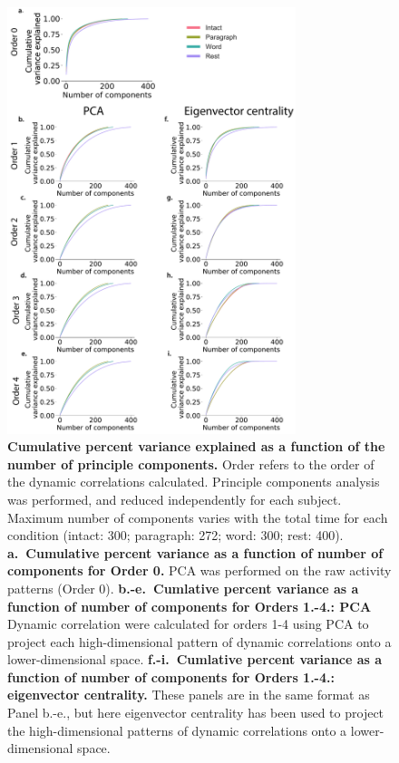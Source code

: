 \documentclass[english]{article}
\begin{document}
\begin{figure}[p!]
\centering
\includegraphics[width=0.75\textwidth]{figs/pca}
\caption{\textbf{Cumulative percent variance explained as a function
    of the number of principle components.}  Order refers to the order of the dynamic
    correlations calculated. Principle components analysis was
    performed, and reduced independently for each subject.  Maximum number of components varies with
    the total time for each condition (intact: 300; paragraph: 272;
    word: 300; rest: 400). \textbf{a.~Cumulative percent
    variance as a function of number of components for Order 0.} PCA
  was performed on the raw activity patterns (Order 0). \textbf{b.-e.~Cumlative percent
    variance as a function of number of components for Orders 1.-4.:
    PCA} Dynamic correlation were calculated for orders 1-4 using PCA to
    project each high-dimensional pattern of dynamic correlations onto
    a lower-dimensional space.   \textbf{f.-i.~Cumlative percent
    variance as a function of number of components for Orders 1.-4.: eigenvector centrality.} These panels are in the
    same format as Panel b.-e., but here eigenvector centrality has been
    used to project the high-dimensional patterns of dynamic
    correlations onto a lower-dimensional space. }
\label{fig:pca}
\end{figure}





\newpage
\renewcommand{\refname}{Supplementary references}


\end{document}
